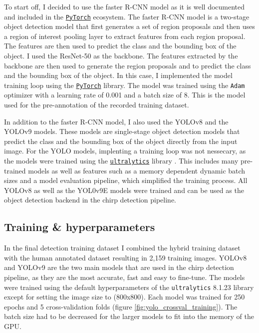 To start off, I decided to use the faster R-CNN model as it is well
documented and included in the \href{pytorch.org}{\texttt{PyTorch}} ecosystem.
The faster R-CNN model is a two-stage object detection model that first
generates a set of region proposals and then uses a region of interest pooling
layer to extract features from each region proposal. The features are then used
to predict the class and the bounding box of the object. I used the
ResNet-50 as the backbone. The features extracted by the backbone are
then used to generate the region proposals and to predict the class and the
bounding box of the object. In this case, I implemented the model training loop
using the \href{pytorch.org}{\texttt{PyTorch}} library. The model was trained
using the \texttt{Adam} optimizer with a learning rate of 0.001 and a batch
size of 8. This is the model used for the pre-annotation of the recorded
training dataset.

In addition to the faster R-CNN model, I also used the YOLOv8 and the
YOLOv9 models. These models are single-stage object detection models
that predict the class and the bounding box of the object directly from the
input image. For the YOLO models, implenting a training loop was not nessecary,
as the models were trained using the
\href{https://ultralytics.com}{\texttt{ultralytics}} library
\parencite{yolov8_ultralytics}. This includes many pre-trained models as well
as features such as a memory dependent dynamic batch sizes and a model
evaluation pipeline, which simplified the training process. All YOLOv8 as well
as the YOL0v9E models were trained and can be used as the object detection
backend in the chirp detection pipeline.

\subsection{Training \& hyperparameters}

In the final detection training dataset I combined the hybrid training dataset
with the human annotated dataset resulting in 2,159 training images. YOLOv8 and
YOLOv9 are the two main models that are used in the chirp detection pipeline,
as they are the most accurate, fast and easy to fine-tune. The models were
trained using the default hyperparameters of the \texttt{ultralytics} 8.1.23
library except for setting the image size to (800x800). Each model was trained
for 250 epochs and 5 cross-validation folds (figure
\ref{fig:yolo_crossval_training}). The batch size had to be decreased for the
larger models to fit into the memory of the GPU.

